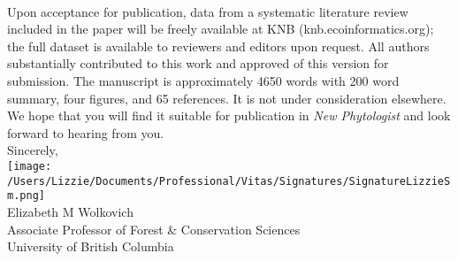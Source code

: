\documentclass[11pt,a4paper]{letter}
\begin{document}
\vspace{1.5ex}\\
Upon acceptance for publication, data from a systematic literature review included in the paper will be freely available at KNB (knb.ecoinformatics.org); the full dataset is available to reviewers and editors upon request.  All authors substantially contributed to this work and approved of this version for submission. The manuscript is approximately 4650 words with 200 word summary, four figures, and 65 references. It is not under consideration elsewhere. We hope that you will find it suitable for publication in \emph{New Phytologist} and look forward to hearing from you.
\vspace{1.5ex}\\
Sincerely,\\

\texttt{[image: /Users/Lizzie/Documents/Professional/Vitas/Signatures/SignatureLizzieSm.png]} \\

Elizabeth M Wolkovich\\
Associate Professor of Forest \& Conservation Sciences\\ 
University of British Columbia\\
\end{document}
